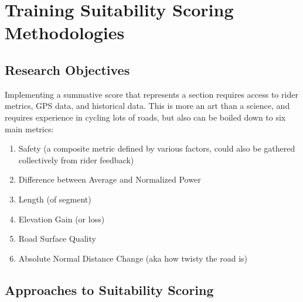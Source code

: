 \documentclass[12pt,a4paper]{article}
\begin{document}
\section{Training Suitability Scoring Methodologies}

\subsection{Research Objectives}
Implementing a summative score that represents a section requires access to rider metrics, GPS data, and historical data. This is more an art than a science, and requires
experience in cycling lots of roads, but also can be boiled down to six main metrics:
\begin{enumerate}
	\item Safety (a composite metric defined by various factors, could also be gathered collectively from rider feedback)
	\item Difference between Average and Normalized Power
	\item Length (of segment)
	\item Elevation Gain (or loss)
	\item Road Surface Quality
	\item Absolute Normal Distance Change (aka how twisty the road is)
\end{enumerate}


\subsection{Approaches to Suitability Scoring}
\end{document}
